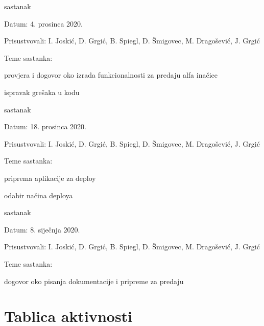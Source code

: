 \begin{packed_enum}
	\item  sastanak
	\item[] \begin{packed_item}
		\item Datum: 4. prosinca 2020.
		\item Prisustvovali: I. Joskić, D. Grgić, B. Spiegl, D. Šmigovec, M. Dragošević, J. Grgić
		\item Teme sastanka:
		\begin{packed_item}
			\item  provjera i dogovor oko izrada funkcionalnosti za predaju alfa inačice
			\item  ispravak grešaka u kodu
		\end{packed_item}
	\end{packed_item}

	\item  sastanak
	\item[] \begin{packed_item}
		\item Datum: 18. prosinca 2020.
		\item Prisustvovali: I. Joskić, D. Grgić, B. Spiegl, D. Šmigovec, M. Dragošević, J. Grgić
		\item Teme sastanka:
		\begin{packed_item}
			\item  priprema aplikacije za deploy
			\item  odabir načina deploya
		\end{packed_item}
	\end{packed_item}

	\item  sastanak
	\item[] \begin{packed_item}
		\item Datum: 8. siječnja 2020.
		\item Prisustvovali: I. Joskić, D. Grgić, B. Spiegl, D. Šmigovec, M. Dragošević, J. Grgić
		\item Teme sastanka:
		\begin{packed_item}
			\item  dogovor oko pisanja dokumentacije i pripreme za predaju
		\end{packed_item}
	\end{packed_item}
	
	
\end{packed_enum}

\eject
\section*{Tablica aktivnosti}

